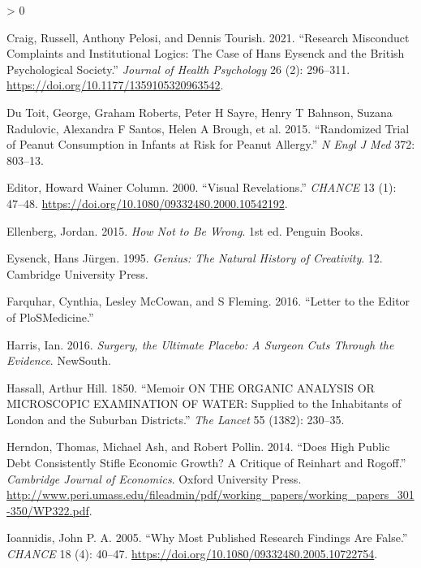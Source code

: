\documentclass[
  10pt,
  b5paper]{book}
\newlength{\cslhangindent}
\newenvironment{CSLReferences}[2] %
 {%
  \setlength{\parindent}{0pt}
  \ifodd #1 \everypar{\setlength{\hangindent}{\cslhangindent}}\ignorespaces\fi
  \ifnum #2 > 0
  \setlength{\parskip}{#2\baselineskip}
  \fi
 }%
 {}
\begin{document}
\begin{CSLReferences}{1}{0}
\leavevmode\hypertarget{ref-CraigEtAl}{}%
Craig, Russell, Anthony Pelosi, and Dennis Tourish. 2021. {``Research Misconduct Complaints and Institutional Logics: The Case of Hans Eysenck and the British Psychological Society.''} \emph{Journal of Health Psychology} 26 (2): 296--311. \url{https://doi.org/10.1177/1359105320963542}.

\leavevmode\hypertarget{ref-du2015randomized}{}%
Du Toit, George, Graham Roberts, Peter H Sayre, Henry T Bahnson, Suzana Radulovic, Alexandra F Santos, Helen A Brough, et al. 2015. {``Randomized Trial of Peanut Consumption in Infants at Risk for Peanut Allergy.''} \emph{N Engl J Med} 372: 803--13.

\leavevmode\hypertarget{ref-wainer-regress}{}%
Editor, Howard Wainer Column. 2000. {``Visual Revelations.''} \emph{CHANCE} 13 (1): 47--48. \url{https://doi.org/10.1080/09332480.2000.10542192}.

\leavevmode\hypertarget{ref-ellenberg_2015}{}%
Ellenberg, Jordan. 2015. \emph{How Not to Be Wrong}. 1st ed. Penguin Books.

\leavevmode\hypertarget{ref-eysenck1995genius}{}%
Eysenck, Hans Jürgen. 1995. \emph{Genius: The Natural History of Creativity}. 12. Cambridge University Press.

\leavevmode\hypertarget{ref-farquhar2016letter}{}%
Farquhar, Cynthia, Lesley McCowan, and S Fleming. 2016. {``Letter to the Editor of PloSMedicine.''}

\leavevmode\hypertarget{ref-harris2016book}{}%
Harris, Ian. 2016. \emph{Surgery, the Ultimate Placebo: A Surgeon Cuts Through the Evidence}. NewSouth.

\leavevmode\hypertarget{ref-hassall1850memoir}{}%
Hassall, Arthur Hill. 1850. {``Memoir ON THE ORGANIC ANALYSIS OR MICROSCOPIC EXAMINATION OF WATER: Supplied to the Inhabitants of London and the Suburban Districts.''} \emph{The Lancet} 55 (1382): 230--35.

\leavevmode\hypertarget{ref-herndon2014does}{}%
Herndon, Thomas, Michael Ash, and Robert Pollin. 2014. {``Does High Public Debt Consistently Stifle Economic Growth? A Critique of Reinhart and Rogoff.''} \emph{Cambridge Journal of Economics}. Oxford University Press. \url{http://www.peri.umass.edu/fileadmin/pdf/working_papers/working_papers_301-350/WP322.pdf}.

\leavevmode\hypertarget{ref-r19_ioannidis_2005}{}%
Ioannidis, John P. A. 2005. {``Why Most Published Research Findings Are False.''} \emph{CHANCE} 18 (4): 40--47. \url{https://doi.org/10.1080/09332480.2005.10722754}.


\end{CSLReferences}
\end{document}
